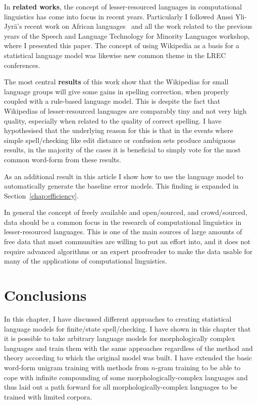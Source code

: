 \documentclass[officiallayout]{unihelcompling}
\begin{document}
In \textbf{related works}, the concept of lesser-resourced languages in
computational linguistics has come into focus in recent years. Particularly I
followed Anssi Yli-Jyrä's recent work on African
languages~\citep{yli2005toward} and all the work related to the previous years
of the Speech and Language Technology for Minority Languages workshop, where I
presented this paper.  The concept of using Wikipedia as a basis for a
statistical language model was likewise new common theme in the LREC
conferences.

The most central \textbf{results} of this work show that the Wikipedias for
small language groups will give some gains in spelling correction, when
properly coupled with a rule-based language model. This is despite the fact
that Wikipedias of lesser-resourced languages are comparably tiny and not very
high quality, especially when related to the quality of correct spelling.  I
have hypothesised that the underlying reason for this is that in the events
where simple spell\-/checking like edit distance or confusion sets produce
ambiguous results, in the majority of the cases it is beneficial to simply vote
for the most common word-form from these results.

As an additional result in this article I show how to use the language model to
automatically generate the baseline error models. This finding is expanded in
Section~\ref{chap:efficiency}.

In general the concept of freely available and open\-/sourced, and
crowd\-/sourced, data should be a common focus in the research of computational
linguistics in lesser-resourced languages. This is one of the main sources of
large amounts of free data that most communities are willing to put an effort
into, and it does not require advanced algorithms or an expert proofreader to
make the data usable for many of the applications of computational linguistics.

\section{Conclusions}

In this chapter, I have discussed different approaches to creating
statistical language models for finite\-/state spell\-/checking. I have
shown in this chapter that it is possible to take arbitrary language models for
morphologically complex languages and train them with the same approaches
regardless of the method and theory according to which the original model was
built. I have extended the basic word-form unigram training with methods from
\(n\)-gram training to be able to cope with infinite compounding of some
morphologically-complex languages and thus laid out a path forward for all
morphologically-complex languages to be trained with limited corpora.
\end{document}
